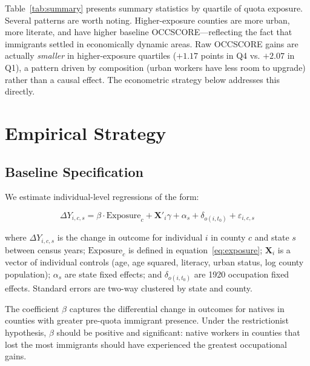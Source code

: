 \documentclass[12pt]{article}
\begin{document}
Table~\ref{tab:summary} presents summary statistics by quartile of quota exposure. Several patterns are worth noting. Higher-exposure counties are more urban, more literate, and have higher baseline OCCSCORE---reflecting the fact that immigrants settled in economically dynamic areas. Raw OCCSCORE gains are actually \textit{smaller} in higher-exposure quartiles ($+1.17$ points in Q4 vs. $+2.07$ in Q1), a pattern driven by composition (urban workers have less room to upgrade) rather than a causal effect. The econometric strategy below addresses this directly.





\section{Empirical Strategy}
\label{sec:strategy}

\subsection{Baseline Specification}

We estimate individual-level regressions of the form:

\begin{equation}
\Delta Y_{i,c,s} = \beta \cdot \text{Exposure}_c + \mathbf{X}'_i \gamma + \alpha_s + \delta_{o(i,t_0)} + \varepsilon_{i,c,s}
\label{eq:baseline}
\end{equation}

\noindent where $\Delta Y_{i,c,s}$ is the change in outcome for individual $i$ in county $c$ and state $s$ between census years; $\text{Exposure}_c$ is defined in equation~\eqref{eq:exposure}; $\mathbf{X}_i$ is a vector of individual controls (age, age squared, literacy, urban status, log county population); $\alpha_s$ are state fixed effects; and $\delta_{o(i,t_0)}$ are 1920 occupation fixed effects. Standard errors are two-way clustered by state and county.

The coefficient $\beta$ captures the differential change in outcomes for natives in counties with greater pre-quota immigrant presence. Under the restrictionist hypothesis, $\beta$ should be positive and significant: native workers in counties that lost the most immigrants should have experienced the greatest occupational gains.
\end{document}
